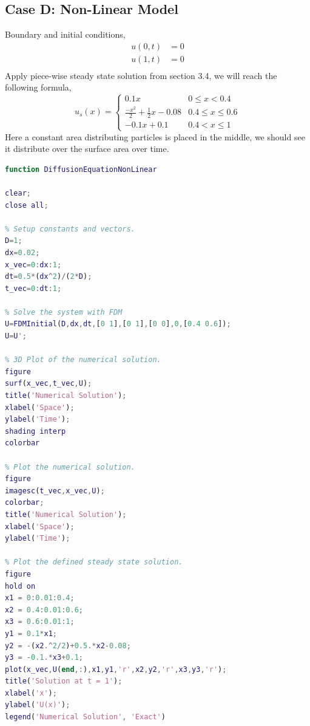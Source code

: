 \documentclass{article}
\begin{document}
\subsection{Case D: Non-Linear Model}
\noindent Boundary and initial conditions,
\[
	\begin{split}
		u(0,t) &= 0 \\
		u(1,t) &= 0 \\
	\end{split}
\]
Apply piece-wise steady state solution from section 3.4, we will reach the following formula,
\[ 
	u_s(x) = \begin{cases} 
      0.1x & 0 \leq x < 0.4 \\
      \frac{-x^2}{2} + \frac{1}{2}x - 0.08 & 0.4 \leq x\leq 0.6 \\
      -0.1x + 0.1 & 0.4 < x \leq 1
   \end{cases}
\]
Here a constant area distributing particles is placed in the middle, we should see it distribute over the surface area over time.
\begin{lstlisting}[language=Matlab]
function DiffusionEquationNonLinear

clear;
close all;

% Setup constants and vectors.
D=1;
dx=0.02;
x_vec=0:dx:1;
dt=0.5*(dx^2)/(2*D);
t_vec=0:dt:1;

% Solve the system with FDM
U=FDMInitial(D,dx,dt,[0 1],[0 1],[0 0],0,[0.4 0.6]);
U=U';

% 3D Plot of the numerical solution.
figure
surf(x_vec,t_vec,U);
title('Numerical Solution');
xlabel('Space');
ylabel('Time');
shading interp
colorbar

% Plot the numerical solution.
figure
imagesc(t_vec,x_vec,U);
colorbar;
title('Numerical Solution');
xlabel('Space');
ylabel('Time');

% Plot the defined steady state solution.
figure
hold on
x1 = 0:0.01:0.4;
x2 = 0.4:0.01:0.6;
x3 = 0.6:0.01:1;
y1 = 0.1*x1;
y2 = -(x2.^2/2)+0.5.*x2-0.08;
y3 = -0.1.*x3+0.1;
plot(x_vec,U(end,:),x1,y1,'r',x2,y2,'r',x3,y3,'r');
title('Solution at t = 1');
xlabel('x');
ylabel('U(x)');
legend('Numerical Solution', 'Exact')
\end{lstlisting}
\end{document}

